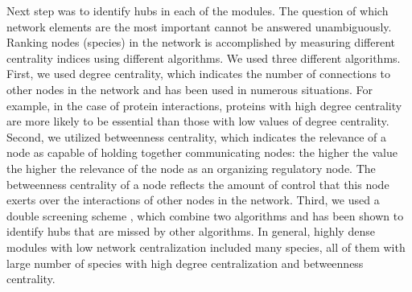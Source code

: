 Next step was to identify hubs in each of the modules. The question of which network elements are the most important cannot be answered unambiguously. Ranking nodes (species) in the network is accomplished by measuring different centrality indices using different algorithms. We used three different algorithms. First, we used degree centrality, which indicates the number of connections to other nodes in the network and has been used in numerous situations. For example, in the case of protein interactions, proteins with high degree centrality are more likely to be essential than those with low values of degree centrality. Second, we utilized betweenness centrality, which indicates the relevance of a node as capable of holding together communicating nodes: the higher the value the higher the relevance of the node as an organizing regulatory node. The betweenness centrality of a node reflects the amount of control that this node exerts over the interactions of other nodes in the network. Third, we used a double screening scheme , which combine two algorithms  and has been shown to identify hubs that are missed by other algorithms. In general, highly dense modules with low network centralization included many species, all of them with large number of species with high degree centralization and betweenness centrality.




